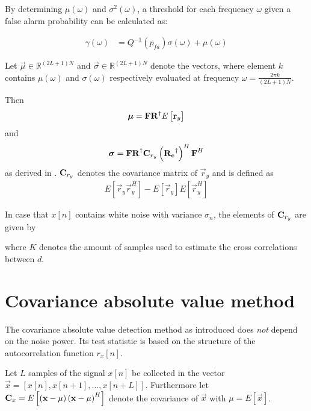 \documentclass[a4paper, openany, oneside]{memoir}
\begin{document}
By determining $\mu (\omega)$ and $\sigma^2 (\omega)$, a threshold for each frequency $\omega$ given a false alarm probability can be calculated as:

\begin{align*}
\gamma(\omega) &= Q^{-1}(p_{fa})\sigma (\omega) + \mu (\omega) 
\end{align*}

Let 
$\vec{\mu} \in \mathbb{R}^{(2L+1)N}$ and $\vec{\sigma} \in \mathbb{R}^{(2L+1)N}$ denote the vectors, where element $k$ contains $\mu(\omega)$ and $\sigma(\omega)$ respectively evaluated at frequency $\omega = \frac{2\pi k}{(2L+1)N}$.

Then 
\begin{align*}
\boldsymbol{\mathbf{\mu}} = \boldsymbol{\mathbf{F}}\boldsymbol{\mathbf{R}}^{\dagger}E\left[\boldsymbol{\mathbf{r}}_y\right]
\end{align*}
and
\begin{align*}
\boldsymbol{\mathbf{\sigma}} = \boldsymbol{\mathbf{F}}\boldsymbol{\mathbf{R}}^{\dagger}\boldsymbol{\mathbf{C}}_{r_y} \left(\boldsymbol{\mathbf{R_c}}^{\dagger}\right)^{H}\boldsymbol{\mathbf{F}}^H
\end{align*}
as derived in \cite{ariananda2012compressive}. $\boldsymbol{\mathbf{C}}_{r_y}$ denotes the covariance matrix of $\vec{r}_y$ and is defined as
\begin{align*}
 E\left[\vec{r}_y\vec{r}_y^H\right] - E\left[\vec{r}_y\right]E\left[\vec{r}_y^H\right]
\end{align*}

In case that $x[n]$ contains white noise with variance $\sigma_n$, the elements of $\boldsymbol{\mathbf{C}}_{r_y}$ are given by


where $K$ denotes the amount of samples used to estimate the cross correlations between $d$.

\section{Covariance absolute value method}
The covariance absolute value detection method as introduced does \emph{not} depend on the noise power. Its test statistic is based on the structure of the autocorrelation function $r_x[n]$.

Let $L$ samples of the signal $x[n]$ be collected in the vector $\vec{x} = \left[x[n], x[n+1], \ldots, x[n+L]\right]$. 
Furthermore let $\boldsymbol{\mathbf{C}}_x = E\left[\left(\boldsymbol{\mathbf{x}} - \mu \right)\left(\boldsymbol{\mathbf{x}} - \mu \right)^H\right]$ denote the covariance of $\vec{x}$ with $\mu = E[\vec{x}]$.
\end{document}
